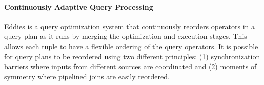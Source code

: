 \paragraph{Continuously Adaptive Query Processing}

Eddies \citep{Avnur2000} is a query optimization system that continuously reorders operators in a query plan as it runs by merging the optimization and execution stages. This allows each tuple to have a flexible ordering of the query operators. It is possible for query plans to be reordered using two different principles: (1) synchronization barriers where inputs from different sources are coordinated and (2) moments of symmetry where pipelined joins are easily reordered.